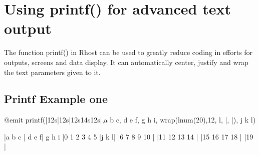 \documentclass[letterpaper,10pt,english]{sphinxmanual}
\begin{document}
\begin{sphinxVerbatim}[commandchars=\\\{\}]
                                   
                          
                            
                               
\end{sphinxVerbatim}


\section{Using printf() for advanced text output}
\label{\detokenize{advanced:using-printf-for-advanced-text-output}}
\sphinxAtStartPar
The function printf() in Rhost can be used to greatly reduce coding in efforts for outputs,
screens and data display.  It can automatically center, justify and wrap the text parameters given to it.


\subsection{Printf Example one}
\label{\detokenize{advanced:printf-example-one}}
\begin{sphinxVerbatim}[commandchars=\\\{\}]
@emit printf(|\PYGZdl{}\PYGZhy{}12s|\PYGZdl{}12s|\PYGZdl{}\PYGZca{}12s\PYGZdl{}\PYGZam{}14s\PYGZdl{}\PYGZus{}12s|,a b c, d e f, g h i, wrap(lnum(20),12, l, |, |), j k l)

|a b c       |       d e f|   g h i    |0 1 2 3 4 5 |j     k    l|
                                       |6 7 8 9 10  |
                                       |11 12 13 14 |
                                       |15 16 17 18 |
                                       |19          |
\end{sphinxVerbatim}
\end{document}
